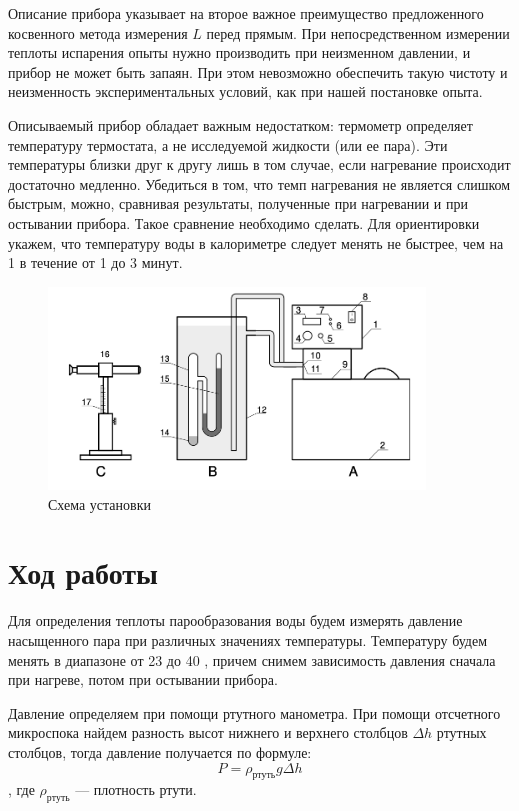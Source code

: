 \documentclass[a4paper,12pt]{article}
\begin{document}
  Описание прибора указывает на второе важное преимущество предложенного косвенного метода измерения $ L $ перед прямым. При непосредственном измерении теплоты испарения опыты нужно производить при неизменном давлении, и прибор не может быть запаян. При этом невозможно обеспечить такую чистоту и неизменность экспериментальных условий, как при нашей постановке опыта.

  Описываемый прибор обладает важным недостатком: термометр определяет температуру термостата, а не исследуемой жидкости (или ее пара). Эти температуры близки друг к другу лишь в том случае, если нагревание происходит достаточно медленно. Убедиться в том, что темп нагревания не является слишком быстрым, можно, сравнивая результаты, полученные при нагревании и при остывании прибора. Такое сравнение необходимо сделать. Для ориентировки укажем, что температуру воды в калориметре следует менять не быстрее, чем на 1 \textcelsius{} в течение от 1 до 3 минут.

  \begin{figure}[H]
    \centering
    \includegraphics[width=10cm]{apparatus.jpg}
    \caption{Схема установки}
    \label{apparatus}
  \end{figure}

\section{Ход работы}

  Для определения теплоты парообразования воды будем измерять давление насыщенного пара при различных значениях температуры. Температуру будем менять в диапазоне от 23 до 40 \textcelsius{}, причем снимем зависимость давления сначала при нагреве, потом при остывании прибора.

  Давление определяем при помощи ртутного манометра. При помощи отсчетного микроспока найдем разность высот нижнего и верхнего столбцов $\Delta h$ ртутных столбцов, тогда давление получается по формуле:
  \begin{equation}
    P = \rho_{ртуть} g \Delta h
  \end{equation},
  где $ \rho_{ртуть}$ --- плотность ртути.
\end{document}
